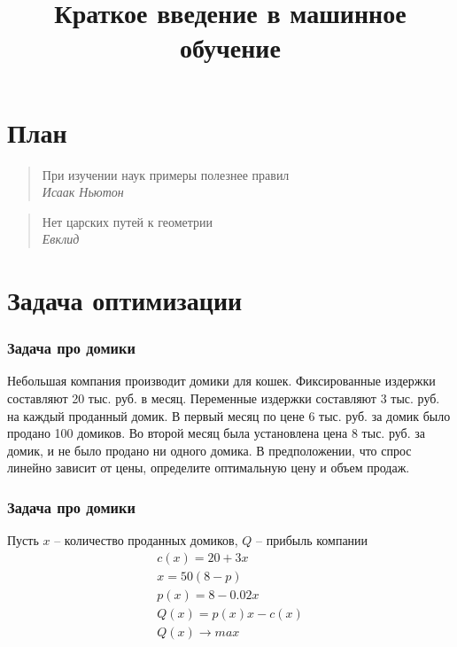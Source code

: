 \documentclass[fullscreen=true, bookmarks=false]{beamer} %
\title{Краткое введение в машинное обучение}
\begin{document}
 \begin{frame}
 \transdissolve[duration=0.2]
 \titlepage
 \end{frame}

\section*{План}

\begin{frame}
\begin{quote}
При изучении наук примеры полезнее правил\\
{\em Исаак Ньютон}
\end{quote}

\begin{quote}
Нет царских путей к геометрии\\
{\em Евклид}
\end{quote}
\end{frame}


\begin{frame}
 \transdissolve[duration=0.2]
 \tableofcontents[]
\end{frame}


\section{Задача оптимизации}


\begin{frame}{}
 \frametitle{Задача про домики}
Небольшая компания производит домики для кошек. Фиксированные издержки составляют 20 тыс. руб. в месяц. Переменные издержки составляют 3 тыс. руб. на каждый проданный домик. В первый месяц по цене 6 тыс. руб. за домик было продано 100 домиков. Во второй месяц была установлена цена 8 тыс. руб. за домик, и не было продано ни одного домика. В предположении, что спрос линейно зависит от цены, определите оптимальную цену и объем продаж.
\end{frame}


\begin{frame}{}
 \frametitle{Задача про домики}
 
Пусть $x$ -- количество проданных домиков, $Q$ -- прибыль компании
\begin{gather*}
\nonumber
 c(x) = 20 + 3x\\
\nonumber
 x = 50(8-p)\\
\nonumber
 p(x) = 8-0.02x\\
\nonumber
 Q(x) = p(x)x - c(x)\\
\nonumber
 Q(x) \rightarrow max
\end{gather*}

\end{frame}
\end{document}
